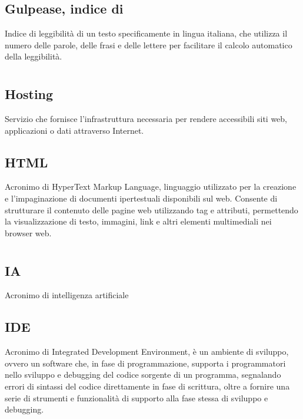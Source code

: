 \subsection*{Gulpease, indice di}
Indice di leggibilità di un testo specificamente in lingua italiana, che utilizza il numero delle parole, delle frasi e delle lettere per facilitare il 
calcolo automatico della leggibilità.

\newpage



\section{}

\hypertarget{sec:hosting}{}
\subsection*{Hosting}
Servizio che fornisce l’infrastruttura necessaria per rendere accessibili siti web, applicazioni o dati attraverso Internet.

\hypertarget{sec:html}{}
\subsection*{HTML}
Acronimo di HyperText Markup Language, linguaggio utilizzato per la creazione e l’impaginazione di documenti ipertestuali disponibili 
sul web. Consente di strutturare il contenuto delle pagine web utilizzando tag e attributi, permettendo la visualizzazione di testo, 
immagini, link e altri elementi multimediali nei browser web.

\newpage



\section{}

\hypertarget{sec:ia}{}
\subsection*{IA}
Acronimo di intelligenza artificiale

\hypertarget{sec:ide}{}
\subsection*{IDE}
Acronimo di Integrated Development Environment, è un ambiente di sviluppo, ovvero un software che, in fase di programmazione, supporta i programmatori 
nello sviluppo e debugging del codice sorgente di un programma, segnalando errori di sintassi del codice direttamente in fase di scrittura, oltre a fornire 
una serie di strumenti e funzionalità di supporto alla fase stessa di sviluppo e debugging.

